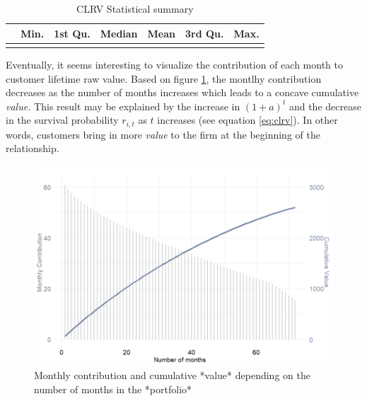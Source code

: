 \documentclass[
]{book}
\begin{document}
\begin{table}[H]

\caption{\label{tab:custValuesStats}CLRV Statistical summary}
\centering
\begin{tabular}[t]{lrrrrrr}
\toprule
  & Min. & 1st Qu. & Median & Mean & 3rd Qu. & Max.\\
\midrule
\cellcolor{gray!6}{} & \cellcolor{gray!6}{323.99} & \cellcolor{gray!6}{1125.9} & \cellcolor{gray!6}{2104.66} & \cellcolor{gray!6}{2598.12} & \cellcolor{gray!6}{3850.41} & \cellcolor{gray!6}{6815.42}\\
\bottomrule
\end{tabular}
\end{table}

Eventually, it seems interesting to visualize the contribution of each month to customer lifetime raw value. Based on figure \ref{fig:clrvEvolution}, the montlhy contribution decreases as the number of months increases which leads to a concave cumulative \emph{value.} This result may be explained by the increase in \((1+a)^t\) and the decrease in the survival probability \(r_{i,t}\) as \(t\) increases (see equation \eqref{eq:clrv}). In other words, customers bring in more \emph{value} to the firm at the beginning of the relationship.

\begin{figure}

{\centering \includegraphics[width=12.5in]{./imgs/clrv_evolution} 

}

\caption{Monthly contribution and cumulative *value* depending on the number of months in the *portfolio*}\label{fig:clrvEvolution}
\end{figure}
\end{document}
